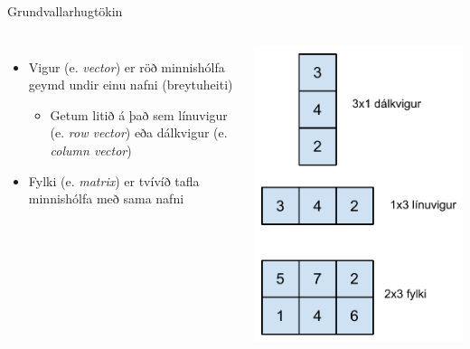 \documentclass[handout]{beamer}
\begin{document}
\begin{frame}{Grundvallarhugtökin}
\begin{columns}
\begin{itemize}
 \item Vigur (e. \emph{vector}) er röð minnishólfa geymd undir einu nafni (breytuheiti)
 \begin{itemize}
  \item Getum litið á það sem línuvigur (e. \emph{row vector}) eða dálkvigur (e. \emph{column vector})
 \end{itemize}
 \item Fylki (e. \emph{matrix}) er tvívíð tafla minnishólfa með sama nafni
\end{itemize}
\begin{center}
\includegraphics[height=0.8\textheight]{Pics/vigrar-og-fylki}
\end{center}
\end{columns}
\end{frame}
\end{document}
